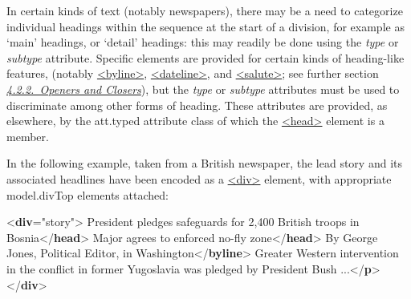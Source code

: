 In certain kinds of text (notably newspapers), there may be a need to categorize individual headings within the sequence at the start of a division, for example as ‘main’ headings, or ‘detail’ headings: this may readily be done using the {\itshape type} or {\itshape subtype} attribute. Specific elements are provided for certain kinds of heading-like features, (notably \hyperref[TEI.byline]{<byline>}, \hyperref[TEI.dateline]{<dateline>}, and \hyperref[TEI.salute]{<salute>}; see further section \textit{\hyperref[DSOC]{4.2.2.\ Openers and Closers}}), but the {\itshape type} or {\itshape subtype} attributes must be used to discriminate among other forms of heading. These attributes are provided, as elsewhere, by the \textsf{att.typed} attribute class of which the \hyperref[TEI.head]{<head>} element is a member.\par
In the following example, taken from a British newspaper, the lead story and its associated headlines have been encoded as a \hyperref[TEI.div]{<div>} element, with appropriate \textsf{model.divTop} elements attached: \par\bgroup{}\exampleFont \begin{shaded}\noindent\mbox{}{<\textbf{div}\hspace*{1em}{type}="{story}">}\mbox{}\newline 
{}President pledges safeguards for 2,400 British\mbox{}\newline 
\hspace*{1em}\hspace*{1em} troops in Bosnia{</\textbf{head}>}\mbox{}\newline 
{}Major agrees to enforced no-fly zone{</\textbf{head}>}\mbox{}\newline 
{}By George Jones, Political Editor, in Washington{</\textbf{byline}>}\mbox{}\newline 
{}Greater Western intervention in the conflict in\mbox{}\newline 
\hspace*{1em}\hspace*{1em} former Yugoslavia was pledged by President Bush ...{</\textbf{p}>}\mbox{}\newline 
{</\textbf{div}>}\end{shaded}\egroup\par \noindent  \par
